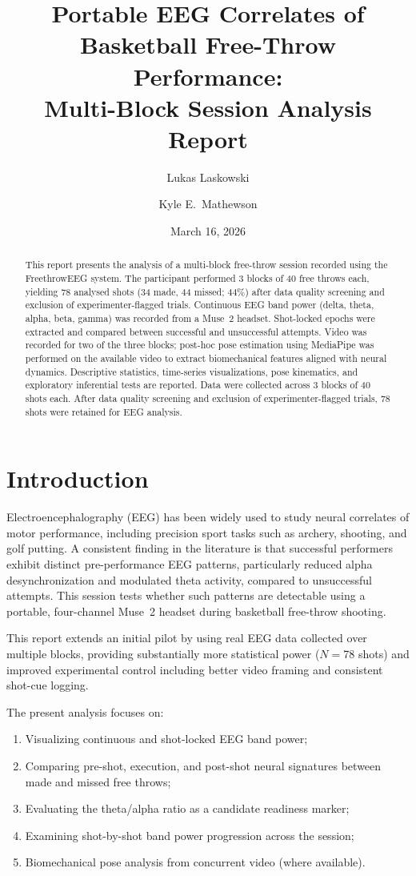 \documentclass[11pt,a4paper]{article}
\title{%
  Portable EEG Correlates of Basketball Free-Throw Performance:\\
  Multi-Block Session Analysis Report
}
\author{Lukas Laskowski \and Kyle E.\ Mathewson}
\date{March 16, 2026}
\begin{document}
\maketitle

\begin{abstract}
This report presents the analysis of a multi-block free-throw session recorded
using the FreethrowEEG system. The participant performed 3 blocks of
40 free throws each, yielding 78 analysed shots (34 made,
44 missed; 44\%) after data quality screening and exclusion
of experimenter-flagged trials. Continuous EEG band power (delta, theta, alpha,
beta, gamma) was recorded from a Muse~2 headset. Shot-locked epochs were
extracted and compared between successful and unsuccessful attempts. Video was
recorded for two of the three blocks; post-hoc pose estimation using MediaPipe
was performed on the available video to extract biomechanical features aligned
with neural dynamics. Descriptive statistics, time-series visualizations, pose
kinematics, and exploratory inferential tests are reported. Data were collected across 3 blocks of 40 shots each. After data quality screening and exclusion of experimenter-flagged trials, 78 shots were retained for EEG analysis.
\end{abstract}

\section{Introduction}

Electroencephalography (EEG) has been widely used to study neural correlates of
motor performance, including precision sport tasks such as archery, shooting,
and golf putting. A consistent finding in the literature is that successful
performers exhibit distinct pre-performance EEG patterns, particularly reduced
alpha desynchronization and modulated theta activity, compared to unsuccessful
attempts. This session tests whether such patterns are detectable using a
portable, four-channel Muse~2 headset during basketball free-throw shooting.

This report extends an initial pilot by using real EEG data collected over
multiple blocks, providing substantially more statistical power ($N =
$78 shots) and improved experimental control including better video
framing and consistent shot-cue logging.

The present analysis focuses on:
\begin{enumerate}
  \item Visualizing continuous and shot-locked EEG band power;
  \item Comparing pre-shot, execution, and post-shot neural signatures between
        made and missed free throws;
  \item Evaluating the theta/alpha ratio as a candidate readiness marker;
  \item Examining shot-by-shot band power progression across the session;
  \item Biomechanical pose analysis from concurrent video (where available).
\end{enumerate}
\end{document}
